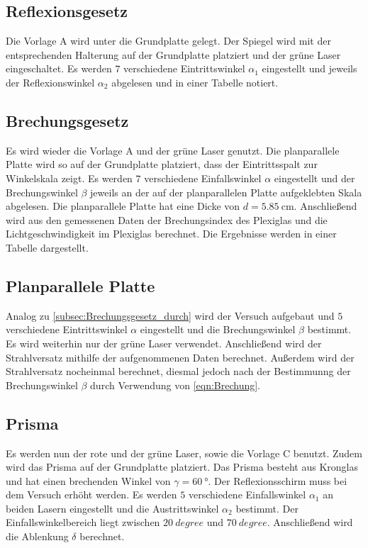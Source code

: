 \subsection{Reflexionsgesetz}
\label{subsec:Reflexionsgesetz_durch}

Die Vorlage A wird unter die Grundplatte gelegt. Der Spiegel wird mit der entsprechenden Halterung auf der Grundplatte platziert und
der grüne Laser eingeschaltet. Es werden $7$ verschiedene Eintrittswinkel $\alpha_1$ eingestellt und jeweils der Reflexionswinkel $\alpha_2$
abgelesen und in einer Tabelle notiert.

\subsection{Brechungsgesetz}
\label{subsec:Brechungsgesetz_durch}

Es wird wieder die Vorlage A und der grüne Laser genutzt. Die planparallele Platte wird so auf der Grundplatte platziert, dass der
Eintrittsspalt zur Winkelskala zeigt.
Es werden $7$ verschiedene Einfallswinkel $\alpha$ eingestellt und der Brechungswinkel $\beta$ jeweils an der auf der planparallelen 
Platte aufgeklebten Skala abgelesen.
Die planparallele Platte hat eine Dicke von $d=\qty{5.85}{\centi\meter}$. Anschließend wird aus den gemessenen Daten der Brechungsindex des Plexiglas und die
Lichtgeschwindigkeit im Plexiglas berechnet. Die Ergebnisse werden in einer Tabelle dargestellt.

\subsection{Planparallele Platte}
\label{subsec:Planparallel_durch}

Analog zu \autoref{subsec:Brechungsgesetz_durch} wird der Versuch aufgebaut und $5$ verschiedene Eintrittswinkel $\alpha$ eingestellt
und die Brechungswinkel $\beta$ bestimmt.
Es wird weiterhin nur der grüne Laser verwendet.
Anschließend wird der Strahlversatz mithilfe der aufgenommenen Daten berechnet.
Außerdem wird der Strahlversatz nocheinmal berechnet, diesmal jedoch nach der Bestimmunng der Brechungswinkel $\beta$ durch Verwendung
von \autoref{eqn:Brechung}. 


\subsection{Prisma}
\label{subsec:Prisma_durch}
Es werden nun der rote und der grüne Laser, sowie die Vorlage C benutzt. Zudem wird das Prisma auf der Grundplatte platziert.
Das Prisma besteht aus Kronglas und hat einen brechenden Winkel von $\gamma = \qty{60}{\degree}$.
Der Reflexionsschirm muss bei dem Versuch erhöht werden.
Es werden $5$ verschiedene Einfallswinkel $\alpha_1$ an beiden Lasern eingestellt und die Austrittswinkel $\alpha_2$ bestimmt.
Der Einfallswinkelbereich liegt zwischen $\qty{20}{degree}$ und $\qty{70}{degree}$.
Anschließend wird die Ablenkung $\delta$ berechnet.


